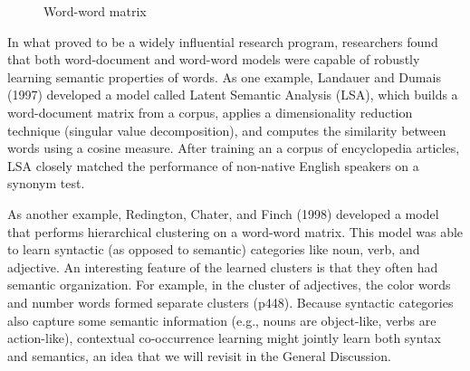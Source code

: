 \documentclass[man,floatsintext]{apa6}
\begin{document}
\begin{figure}
  \begin{center} \footnotesize{}
    \caption{Word-word matrix}
    \label{matrix-word-word}
  \end{center}
\end{figure}

In what proved to be a widely influential research program, researchers found that both word-document and word-word models were capable of robustly learning semantic properties of words. As one example, Landauer and Dumais (1997) developed a model called Latent Semantic Analysis (LSA), which builds a word-document matrix from a corpus, applies a dimensionality reduction technique (singular value decomposition), and computes the similarity between words using a cosine measure. After training an a corpus of encyclopedia articles, LSA closely matched the performance of non-native English speakers on a synonym test.

As another example, Redington, Chater, and Finch (1998) developed a model that performs hierarchical clustering on a word-word matrix. This model was able to learn syntactic (as opposed to semantic) categories like noun, verb, and adjective. An interesting feature of the learned clusters is that they often had semantic organization. For example, in the cluster of adjectives, the color words and number words formed separate clusters (p448). Because syntactic categories also capture some semantic information (e.g., nouns are object-like, verbs are action-like), contextual co-occurrence learning might jointly learn both syntax and semantics, an idea that we will revisit in the General Discussion.  
\end{document}
